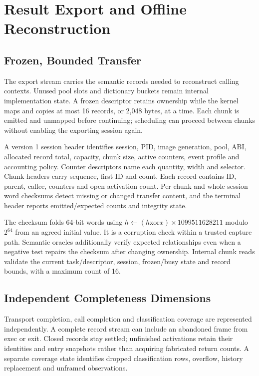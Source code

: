 \section{Result Export and Offline Reconstruction}
\label{sec:export}
\subsection{Frozen, Bounded Transfer}
The export stream carries the semantic records needed to reconstruct calling contexts. Unused pool slots and dictionary buckets remain internal implementation state. A frozen descriptor retains ownership while the kernel maps and copies at most 16 records, or 2,048 bytes, at a time. Each chunk is emitted and unmapped before continuing; scheduling can proceed between chunks without enabling the exporting session again.

A version 1 session header identifies session, PID, image generation, pool, ABI, allocated record total, capacity, chunk size, active counters, event profile and accounting policy. Counter descriptors name each quantity, width and selector. Chunk headers carry sequence, first ID and count. Each record contains ID, parent, callee, counters and open-activation count. Per-chunk and whole-session word checksums detect missing or changed transfer content, and the terminal header reports emitted/expected counts and integrity state.

The checksum folds 64-bit words using $h\leftarrow(h\mathbin{\mathrm{xor}}x)\times 1099511628211$ modulo $2^{64}$ from an agreed initial value. It is a corruption check within a trusted capture path. Semantic oracles additionally verify expected relationships even when a negative test repairs the checksum after changing ownership. Internal chunk reads validate the current task/descriptor, session, frozen/busy state and record bounds, with a maximum count of 16.

\subsection{Independent Completeness Dimensions}
Transport completion, call completion and classification coverage are represented independently. A complete record stream can include an abandoned frame from exec or exit. Closed records stay settled; unfinished activations retain their identities and entry snapshots rather than acquiring fabricated return counts. A separate coverage state identifies dropped classification rows, overflow, history replacement and unframed observations.

